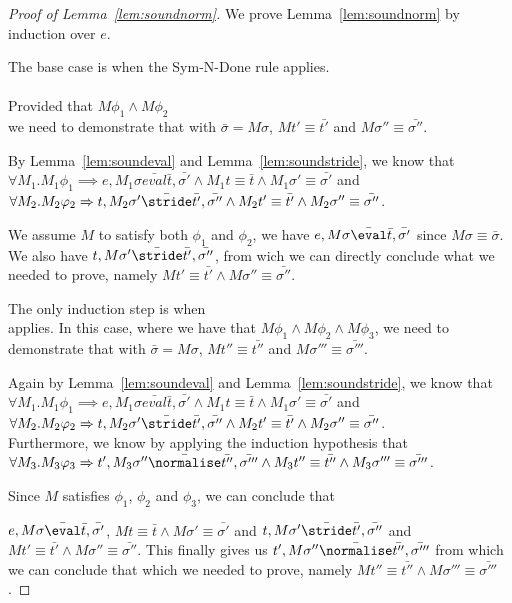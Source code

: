 \begin{proof}[Proof of Lemma~\ref{lem:soundnorm}]
  We prove Lemma~\ref{lem:soundnorm} by induction over $e$.

  The base case is when the Sym-N-Done rule applies.\\
  \\

  Provided that $M\phi_1\land M\phi_2$\\
  we need to demonstrate that
   with $\bar{\sigma}=M\sigma$,
  $M t'\equiv \bar{t'}$ and $M\sigma''\equiv \bar{\sigma''}$.

  By Lemma~\ref{lem:soundeval} and Lemma~\ref{lem:soundstride}, we know that\\
  $\forall M_1. M_1\phi_1 \implies e,M_1\sigma \bar{eval}\bar{t},\bar{\sigma'}\land M_1 t \equiv \bar{t} \land M_1 \sigma'\equiv \bar{\sigma'}$ and\\
  $\forall M_2.M_2\phi_2\implies t,M_2\sigma'\bar{\stride}\bar{t'},\bar{\sigma''}\land M_2 t'\equiv\bar{t'}\land M_2\sigma''\equiv \bar{\sigma''}$.

  We assume $M$ to satisfy both $\phi_1$ and $\phi_2$, we have $e,M\sigma \bar{\eval}\bar{t},\bar{\sigma'}$ since $M\sigma\equiv \bar{\sigma}$.
  We also have $t,M\sigma'\bar{\stride}\bar{t'},\bar{\sigma''}$,
  from wich we can directly conclude what we needed to prove,
  namely $M t'\equiv \bar{t'}\land M\sigma''\equiv \bar{\sigma''}$.

  The only induction step is when\\
   applies.
  In this case, where we have that $M\phi_1\land M\phi_2 \land M\phi_3$,
  we need to demonstrate that
   with $\bar{\sigma}=M\sigma$,
  $M t''\equiv \bar{t''}$ and $M\sigma'''\equiv \bar{\sigma'''}$.

  Again by Lemma~\ref{lem:soundeval} and Lemma~\ref{lem:soundstride}, we know that\\
  $\forall M_1. M_1\phi_1 \implies e,M_1\sigma \bar{eval}\bar{t},\bar{\sigma'}\land M_1 t \equiv \bar{t} \land M_1 \sigma'\equiv \bar{\sigma'}$ and\\
  $\forall M_2.M_2\phi_2\implies t,M_2\sigma'\bar{\stride}\bar{t'},\bar{\sigma''}\land M_2 t'\equiv\bar{t'}\land M_2\sigma''\equiv \bar{\sigma''}$.\\
  Furthermore, we know by applying the induction hypothesis that $\forall M_3.M_3\phi_3 \implies t',M_3\sigma''\bar{\normalise} \bar{t''},\bar{\sigma'''}\land M_3 t''\equiv \bar{t''}\land M_3 \sigma'''\equiv \bar{\sigma'''}$.

  Since $M$ satisfies $\phi_1$, $\phi_2$ and $\phi_3$,
  we can conclude that

  $e,M\sigma \bar{\eval}\bar{t},\bar{\sigma'}$, $M t \equiv \bar{t} \land M \sigma'\equiv \bar{\sigma'}$ and $t,M\sigma'\bar{\stride}\bar{t'},\bar{\sigma''}$ and $M t'\equiv\bar{t'}\land M\sigma''\equiv \bar{\sigma''}$.
  This finally gives us $t',M\sigma''\bar{\normalise} \bar{t''},\bar{\sigma'''}$ from which we can conclude that which we needed to prove,
  namely $M t''\equiv \bar{t''}\land M\sigma'''\equiv \bar{\sigma'''}$.
\end{proof}



